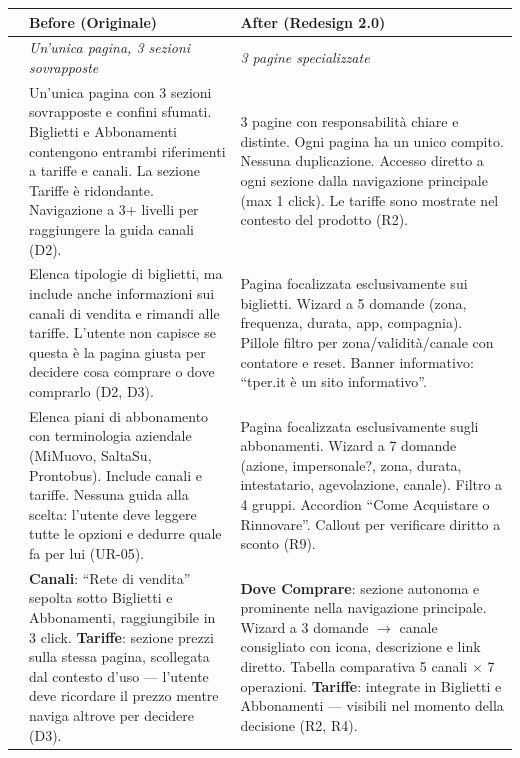 \begin{table}[H]
\centering
\small
\renewcommand{\arraystretch}{1.4}
\begin{tabular}{|p{0.5cm}|p{7cm}|p{7cm}|}
\hline
& \textbf{Before (Originale)} & \textbf{After (Redesign 2.0)} \\ \hline
\cellcolor{primaryColor!15} &
\textit{Un'unica pagina, 3 sezioni sovrapposte} &
\textit{3 pagine specializzate} \\ \hline

\raisebox{0.5cm}{\rotatebox{90}{\textbf{Struttura}}} &
Un'unica pagina con 3 sezioni sovrapposte e confini sfumati. Biglietti e Abbonamenti contengono entrambi riferimenti a tariffe e canali. La sezione Tariffe è ridondante. Navigazione a 3+ livelli per raggiungere la guida canali (D2). &
3 pagine con responsabilità chiare e distinte. Ogni pagina ha un unico compito. Nessuna duplicazione. Accesso diretto a ogni sezione dalla navigazione principale (max 1 click). Le tariffe sono mostrate nel contesto del prodotto (R2). \\ \hline

\raisebox{0.5cm}{\rotatebox{90}{\textbf{Biglietti}}} &
Elenca tipologie di biglietti, ma include anche informazioni sui canali di vendita e rimandi alle tariffe. L'utente non capisce se questa è la pagina giusta per decidere cosa comprare o dove comprarlo (D2, D3). &
Pagina focalizzata esclusivamente sui biglietti. Wizard a 5 domande (zona, frequenza, durata, app, compagnia). Pillole filtro per zona/validità/canale con contatore e reset. Banner informativo: ``tper.it è un sito informativo''. \\ \hline

\raisebox{0.5cm}{\rotatebox{90}{\textbf{Abbonamenti}}} &
Elenca piani di abbonamento con terminologia aziendale (MiMuovo, SaltaSu, Prontobus). Include canali e tariffe. Nessuna guida alla scelta: l'utente deve leggere tutte le opzioni e dedurre quale fa per lui (UR-05). &
Pagina focalizzata esclusivamente sugli abbonamenti. Wizard a 7 domande (azione, impersonale?, zona, durata, intestatario, agevolazione, canale). Filtro a 4 gruppi. Accordion ``Come Acquistare o Rinnovare''. Callout per verificare diritto a sconto (R9). \\ \hline

\raisebox{0.5cm}{\rotatebox{90}{\textbf{Canali / Tariffe}}} &
\textbf{Canali}: ``Rete di vendita'' sepolta sotto Biglietti e Abbonamenti, raggiungibile in 3 click. \textbf{Tariffe}: sezione prezzi sulla stessa pagina, scollegata dal contesto d'uso --- l'utente deve ricordare il prezzo mentre naviga altrove per decidere (D3). &
\textbf{Dove Comprare}: sezione autonoma e prominente nella navigazione principale. Wizard a 3 domande $\rightarrow$ canale consigliato con icona, descrizione e link diretto. Tabella comparativa 5 canali $\times$ 7 operazioni. \textbf{Tariffe}: integrate in Biglietti e Abbonamenti --- visibili nel momento della decisione (R2, R4). \\ \hline


\end{tabular}
\end{table}
